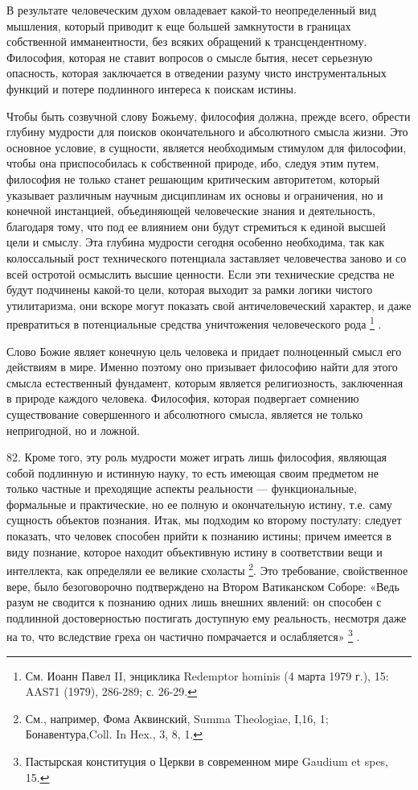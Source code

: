 \documentclass[a5paper,10pt]{article}
\begin{document}
В результате человеческим духом овладевает какой-то неопределенный вид
мышления, который приводит к еще большей замкнутости в границах собственной
имманентности, без всяких обращений к трансцендентному. Философия, которая не
ставит вопросов о смысле бытия, несет серьезную опасность, которая заключается
в отведении разуму чисто инструментальных функций и потере подлинного интереса
к поискам истины.

Чтобы быть созвучной слову Божьему, философия должна, прежде всего, обрести
глубину мудрости для поисков окончательного и абсолютного смысла жизни. Это
основное условие, в сущности, является необходимым стимулом для философии,
чтобы она приспособилась к собственной природе, ибо, следуя этим путем,
философия не только станет решающим критическим авторитетом, который указывает
различным научным дисциплинам их основы и ограничения, но и конечной
инстанцией, объединяющей человеческие знания и деятельность, благодаря тому,
что под ее влиянием они будут стремиться к единой высшей цели и смыслу. Эта
глубина мудрости сегодня особенно необходима, так как колоссальный рост
технического потенциала заставляет человечества заново и со всей остротой
осмыслить высшие ценности. Если эти технические средства не будут подчинены
какой-то цели, которая выходит за рамки логики чистого утилитаризма, они вскоре
могут показать свой античеловеческий характер, и даже превратиться в
потенциальные средства уничтожения человеческого рода \footnote{См. Иоанн Павел
II, энциклика Redemptor hominis (4 марта 1979 г.), 15: AAS71 (1979), 286-289;
с. 26-29.} .

Слово Божие являет конечную цель человека и придает полноценный смысл его
действиям в мире. Именно поэтому оно призывает философию найти для этого смысла
естественный фундамент, которым является религиозность, заключенная в природе
каждого человека. Философия, которая подвергает сомнению существование
совершенного и абсолютного смысла, является не только непригодной, но и ложной.

82. Кроме того, эту роль мудрости может играть лишь философия, являющая собой
подлинную и истинную науку, то есть имеющая своим предметом не только частные и
преходящие аспекты реальности — функциональные, формальные и практические, но
ее полную и окончательную истину, т.е. саму сущность объектов познания. Итак,
мы подходим ко второму постулату: следует показать, что человек способен прийти
к познанию истины; причем имеется в виду познание, которое находит объективную
истину в соответствии вещи и интеллекта, как определяли ее великие схоласты
\footnote{ См., например, Фома Аквинский, Summa Theologiae, I,16, 1;
Бонавентура,Coll. In Hex., 3, 8, 1.}.  Это требование, свойственное вере, было
безоговорочно подтверждено на Втором Ватиканском Соборе: «Ведь разум не
сводится к познанию одних лишь внешних явлений: он способен с подлинной
достоверностью постигать доступную ему реальность, несмотря даже на то, что
вследствие греха он частично помрачается и ослабляется» \footnote{Пастырская
конституция о Церкви в современном мире Gaudium et spes, 15.} .
\end{document}

